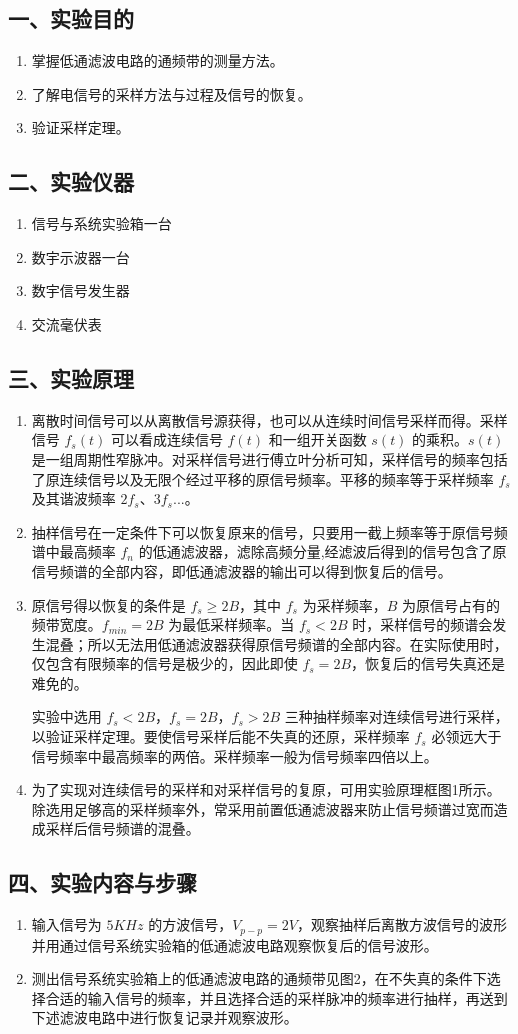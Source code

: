 \documentclass[dvipsnames, svgnames,a4paper,11pt]{article}
\begin{document}
\subsection*{一、实验目的}
\begin{enumerate}
  \item 掌握低通滤波电路的通频带的测量方法。
  \item 了解电信号的采样方法与过程及信号的恢复。
  \item 验证采样定理。
\end{enumerate}

\subsection*{二、实验仪器}
\begin{enumerate}
  \item 信号与系统实验箱一台
  \item 数宇示波器一台
  \item 数宇信号发生器
  \item 交流毫伏表
\end{enumerate}

\subsection*{三、实验原理}

\begin{enumerate}
  \item 离散时间信号可以从离散信号源获得，也可以从连续时间信号采样而得。采样信号 $f_s(t)$ 可以看成连续信号 $f(t)$ 和一组开关函数 $s(t)$ 的乘积。$s(t)$ 是一组周期性窄脉冲。对采样信号进行傅立叶分析可知，采样信号的频率包括了原连续信号以及无限个经过平移的原信号频率。平移的频率等于采样频率 $f_s$ 及其谐波频率 $2f_s$、$3f_s$...。
  \item 抽样信号在一定条件下可以恢复原来的信号，只要用一截上频率等于原信号频谱中最高频率 $f_n$ 的低通滤波器，滤除高频分量,经滤波后得到的信号包含了原信号频谱的全部内容，即低通滤波器的输出可以得到恢复后的信号。
  \item 原信号得以恢复的条件是 $f_s \ge 2B$，其中 $f_s$ 为采样频率，$B$ 为原信号占有的频带宽度。$f_{min}=2B$ 为最低采样频率。当 $f_s < 2B$ 时，采样信号的频谱会发生混叠；所以无法用低通滤波器获得原信号频谱的全部内容。在实际使用时，仅包含有限频率的信号是极少的，因此即使 $f_s=2B$，恢复后的信号失真还是难免的。
  
  实验中选用 $f_s<2B$，$f_s=2B$，$f_s>2B$ 三种抽样频率对连续信号进行采样，以验证采样定理。要使信号采样后能不失真的还原，采样频率 $f_s$ 必领远大于信号频率中最高频率的两倍。采样频率一般为信号频率四倍以上。
  \item 为了实现对连续信号的采样和对采样信号的复原，可用实验原理框图1所示。除选用足够高的采样频率外，常采用前置低通滤波器来防止信号频谱过宽而造成采样后信号频谱的混叠。
\end{enumerate}

\subsection*{四、实验内容与步骤}
\begin{enumerate}
  \item 输入信号为 $5KHz$ 的方波信号，$V_{p-p} = 2V$，观察抽样后离散方波信号的波形并用通过信号系统实验箱的低通滤波电路观察恢复后的信号波形。
  \item 测出信号系统实验箱上的低通滤波电路的通频带见图2，在不失真的条件下选择合适的输入信号的频率，并且选择合适的采样脉冲的频率进行抽样，再送到下述滤波电路中进行恢复记录并观察波形。
\end{enumerate}
\end{document}
